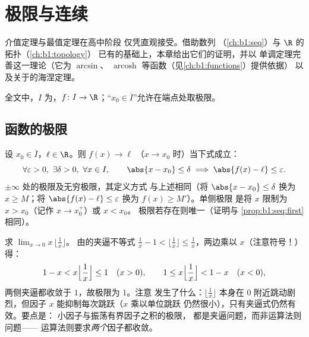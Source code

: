 \chapter{极限与连续}\label{ch:b1:continuity}

介值定理与最值定理在高中阶段
仅凭直观接受。借助数列
（\cref{ch:b1:seq}）与 $\R$ 的拓扑（\cref{ch:b1:topology}）
已有的基础上，本章给出它们的证明，并以
单调定理完善这一理论（它为 $\arcsin$、
$\operatorname{arcosh}$ 等函数（见\cref{ch:b1:functions}）提供依据）
以及关于的海涅定理。

全文中，$I$ 为，$f \colon I \to \R$；“$x_0 \in
\overline I$”允许在端点处取极限。

\section{函数的极限}

\begin{definition}[一点处的极限]\label{def:b1:continuity:limit}
设 $x_0 \in \overline{I}$，$\ell \in \R$。则 $f(x) \to \ell$
（$x \to x_0$ 时）当下式成立：
\[
\forall \varepsilon > 0,\ \exists \delta > 0,\ \forall x \in I,
\qquad \abs{x - x_0} \leq \delta \implies \abs{f(x) - \ell} \leq
\varepsilon .
\]
$\pm\infty$ 处的极限及无穷极限，其定义方式
与上述相同（将 $\abs{x - x_0} \leq \delta$ 换为 $x \geq M$；将 $\abs{f(x) -
\ell} \leq \varepsilon$ 换为 $f(x) \geq M'$）。单侧极限
是将 $x$ 限制为 $x > x_0$（记作 $x \to x_0^+$）或 $x < x_0$。
极限若存在则唯一（证明与
\cref{prop:b1:seq:first}相同）。
\end{definition}

\begin{example}[用夹逼准则求极限]\label{ex:b1:continuity:floorlimit}
求 $\lim_{x \to 0} x\,\bigl\lfloor \frac1x \bigr\rfloor$。
由的夹逼不等式 $\frac1x - 1 < \lfloor \frac1x \rfloor \leq
\frac1x$，两边乘以 $x$（注意符号！）得：
\[
1 - x < x\Bigl\lfloor \frac1x \Bigr\rfloor \leq 1 \quad (x > 0),
\qquad
1 \leq x\Bigl\lfloor \frac1x \Bigr\rfloor < 1 - x \quad (x < 0),
\]
两侧夹逼都收敛于 $1$，故极限为 $1$。注意
发生了什么：$\lfloor \frac1x\rfloor$ 本身在
$0$ 附近跳动剧烈，但因子 $x$ 能抑制每次跳跃（$x$ 乘以单位跳跃
仍然很小），只有夹逼式仍然有效。要点是：
小因子与振荡有界因子之积的极限，
都是夹逼问题，而非运算法则问题——
运算法则要求\emph{两个}因子都收敛。
\end{example}

